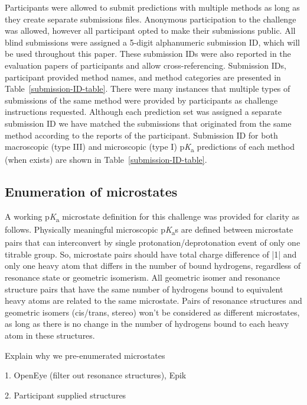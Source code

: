 \documentclass[9pt,lineno,final]{elife}
\newcommand{\pKa}{p\textit{K}\textsubscript{a}}
\begin{document}
Participants were allowed to submit predictions with multiple methods as long as they create separate submissions files. Anonymous participation to the challenge was allowed, however all participant opted to make their submissions public.
All blind submissions were assigned a 5-digit alphanumeric submission ID, which will be used throughout this paper. These submission IDs were also reported in the evaluation papers of participants and allow cross-referencing. Submission IDs, participant provided method names, and method categories are presented in Table~\ref{submission-ID-table}. 
There were many instances that multiple types of submissions of the same method were provided by participants as challenge instructions requested. 
Although each prediction set was assigned a separate submission ID we have matched the submissions that originated from the same method according to the reports of the participant.
Submission ID for both macroscopic (type III) and microscopic (type I) \pKa{} predictions of each method (when exists) are shown in Table~\ref{submission-ID-table}. 





\subsection{Enumeration of microstates} \label{section-enumeration-of-microstates}

A working \pKa{} microstate definition for this challenge was provided for clarity as follows. 
Physically meaningful microscopic \pKa{}s are defined between microstate pairs that can interconvert by single protonation/deprotonation event of only one titrable group. 
So, microstate pairs should have total charge difference of |1| and only one heavy atom that differs in the number of bound hydrogens, regardless of resonance state or geometric isomerism. 
All geometric isomer and resonance structure pairs that have the same number of hydrogens bound to equivalent heavy atoms are related to the same microstate. 
Pairs of resonance structures and geometric isomers (cis/trans, stereo) won't be considered as different microstates, as long as there is no change in the number of hydrogens bound to each heavy atom in these structures.

Explain why we pre-enumerated microstates  

1. OpenEye (filter out resonance structures), Epik  

2. Participant supplied structures  
\end{document}
